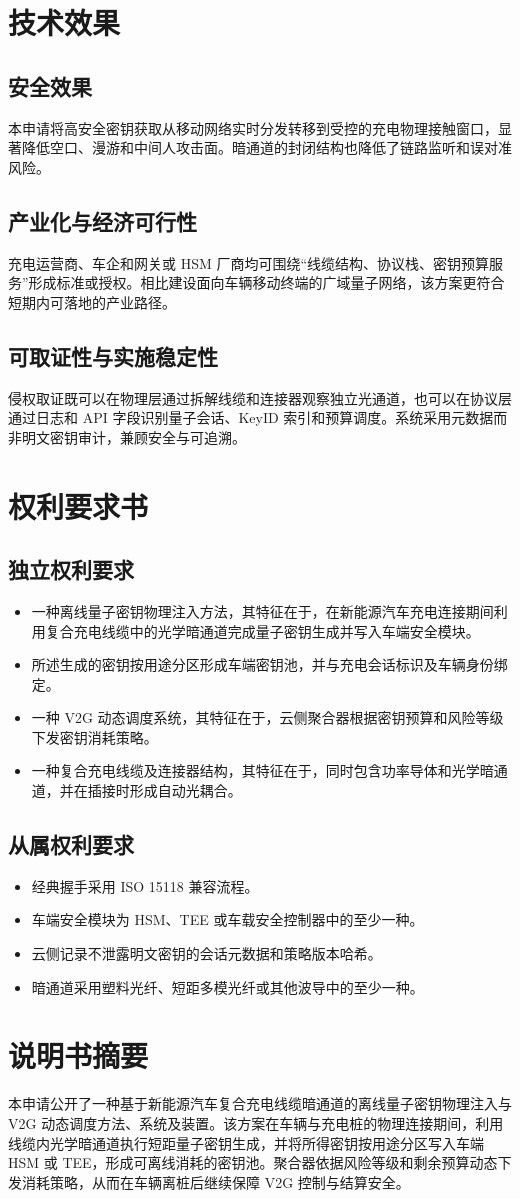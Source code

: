 ﻿\documentclass[12pt,a4paper]{article}
\begin{document}
\section{技术效果}
\subsection{安全效果}
本申请将高安全密钥获取从移动网络实时分发转移到受控的充电物理接触窗口，显著降低空口、漫游和中间人攻击面。暗通道的封闭结构也降低了链路监听和误对准风险。

\subsection{产业化与经济可行性}
充电运营商、车企和网关或 HSM 厂商均可围绕“线缆结构、协议栈、密钥预算服务”形成标准或授权。相比建设面向车辆移动终端的广域量子网络，该方案更符合短期内可落地的产业路径。

\subsection{可取证性与实施稳定性}
侵权取证既可以在物理层通过拆解线缆和连接器观察独立光通道，也可以在协议层通过日志和 API 字段识别量子会话、KeyID 索引和预算调度。系统采用元数据而非明文密钥审计，兼顾安全与可追溯。

\section{权利要求书}
\subsection{独立权利要求}
\begin{itemize}
\item 一种离线量子密钥物理注入方法，其特征在于，在新能源汽车充电连接期间利用复合充电线缆中的光学暗通道完成量子密钥生成并写入车端安全模块。
\item 所述生成的密钥按用途分区形成车端密钥池，并与充电会话标识及车辆身份绑定。
\item 一种 V2G 动态调度系统，其特征在于，云侧聚合器根据密钥预算和风险等级下发密钥消耗策略。
\item 一种复合充电线缆及连接器结构，其特征在于，同时包含功率导体和光学暗通道，并在插接时形成自动光耦合。
\end{itemize}

\subsection{从属权利要求}
\begin{itemize}
\item 经典握手采用 ISO 15118 兼容流程。
\item 车端安全模块为 HSM、TEE 或车载安全控制器中的至少一种。
\item 云侧记录不泄露明文密钥的会话元数据和策略版本哈希。
\item 暗通道采用塑料光纤、短距多模光纤或其他波导中的至少一种。
\end{itemize}

\section{说明书摘要}
本申请公开了一种基于新能源汽车复合充电线缆暗通道的离线量子密钥物理注入与 V2G 动态调度方法、系统及装置。该方案在车辆与充电桩的物理连接期间，利用线缆内光学暗通道执行短距量子密钥生成，并将所得密钥按用途分区写入车端 HSM 或 TEE，形成可离线消耗的密钥池。聚合器依据风险等级和剩余预算动态下发消耗策略，从而在车辆离桩后继续保障 V2G 控制与结算安全。
\end{document}
